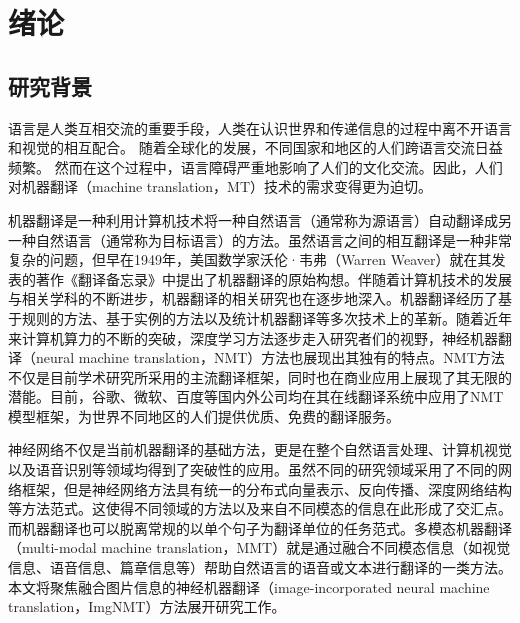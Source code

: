 \chapter{绪论}

\section{研究背景}
语言是人类互相交流的重要手段，人类在认识世界和传递信息的过程中离不开语言和视觉的相互配合。
随着全球化的发展，不同国家和地区的人们跨语言交流日益频繁。
然而在这个过程中，语言障碍严重地影响了人们的文化交流。因此，人们对机器翻译（machine translation，MT）技术的需求变得更为迫切。

机器翻译是一种利用计算机技术将一种自然语言（通常称为源语言）自动翻译成另一种自然语言（通常称为目标语言）的方法。虽然语言之间的相互翻译是一种非常复杂的问题，但早在1949年，美国数学家沃伦·韦弗（Warren Weaver）就在其发表的著作《翻译备忘录》中提出了机器翻译的原始构想。伴随着计算机技术的发展与相关学科的不断进步，机器翻译的相关研究也在逐步地深入。机器翻译经历了基于规则的方法、基于实例的方法以及统计机器翻译等多次技术上的革新。随着近年来计算机算力的不断的突破，深度学习方法逐步走入研究者们的视野，神经机器翻译（neural machine translation，NMT）方法也展现出其独有的特点。NMT方法不仅是目前学术研究所采用的主流翻译框架，同时也在商业应用上展现了其无限的潜能。目前，谷歌、微软、百度等国内外公司均在其在线翻译系统中应用了NMT模型框架，为世界不同地区的人们提供优质、免费的翻译服务。

神经网络不仅是当前机器翻译的基础方法，更是在整个自然语言处理、计算机视觉以及语音识别等领域均得到了突破性的应用。虽然不同的研究领域采用了不同的网络框架，但是神经网络方法具有统一的分布式向量表示、反向传播、深度网络结构等方法范式。这使得不同领域的方法以及来自不同模态的信息在此形成了交汇点。而机器翻译也可以脱离常规的以单个句子为翻译单位的任务范式。多模态机器翻译（multi-modal machine translation，MMT）就是通过融合不同模态信息（如视觉信息、语音信息、篇章信息等）帮助自然语言的语音或文本进行翻译的一类方法。本文将聚焦融合图片信息的神经机器翻译（image-incorporated neural machine translation，ImgNMT）方法展开研究工作。


